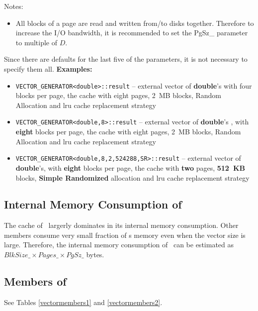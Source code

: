 \documentclass[twoside]{book}
\begin{document}
Notes:
\begin{itemize}
\item All blocks of a page are read and written from/to
disks together. Therefore to increase the I/O bandwidth, it is
recommended to set the PgSz\_ parameter to multiple of $D$.
\end{itemize}

Since there are defaults for the last five
of the parameters, it is not necessary to specify them all.
{\bf Examples:}
\begin{itemize}
\item \texttt{VECTOR\_GENERATOR<double>::result} -- external vector of
{\bf double}'s with four blocks per page, the cache with eight pages, 2~MB
blocks, Random  Allocation and lru cache replacement strategy 
\item \texttt{VECTOR\_GENERATOR<double,8>::result} -- external vector
of {\bf double}'s , with {\bf eight} blocks per page, the cache with eight pages, 2~MB
blocks, Random  Allocation and lru cache replacement strategy 
\item \texttt{VECTOR\_GENERATOR<double,8,2,524288,SR>::result} --
external vector of {\bf double}'s, with {\bf eight} blocks per page, the cache
with {\bf two} pages, {\bf 512~KB} 
blocks, {\bf Simple Randomized} allocation and lru cache replacement strategy 
\end{itemize}

\subsection{Internal Memory Consumption of \xvector}
The cache of \xvector\ largerly dominates in its internal memory
consumption. Other members consume very small fraction of \xvector s
memory even when the vector size is large. Therefore, the internal
memory consumption of \xvector\ can be estimated as
$BlkSize\_ \times Pages\_ \times PgSz\_$ bytes.



\subsection{Members of \xvector}
See Tables \ref{vectormembers1} and  \ref{vectormembers2}.
\end{document}
